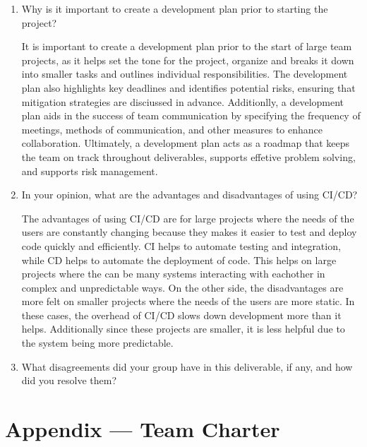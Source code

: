 \documentclass{article}
\begin{document}
\begin{enumerate}
    \item Why is it important to create a development plan prior to starting the
    project?

    It is important to create a development plan prior to the start of large team projects, as it helps set the tone for the project, organize and breaks it down into smaller tasks and outlines individual responsibilities. 
    The development plan also highlights key deadlines and identifies potential risks, ensuring that mitigation strategies are disciussed in advance.
    Additionlly, a development plan aids in the success of team communication by specifying the frequency of meetings, methods of communication, and other measures to enhance collaboration.
    Ultimately, a development plan acts as a roadmap that keeps the team on track throughout deliverables, supports effetive problem solving, and supports risk management.

    \item In your opinion, what are the advantages and disadvantages of using
    CI/CD?

    The advantages of using CI/CD are for large projects where the needs of the users are constantly changing because they makes it easier to test and deploy code quickly and efficiently.
    CI helps to automate testing and integration, while CD helps to automate the deployment of code.
    This helps on large projects where the can be many systems interacting with eachother in complex and unpredictable ways.
    On the other side, the disadvantages are more felt on smaller projects where the needs of the users are more static.
    In these cases, the overhead of CI/CD slows down development more than it helps.
    Additionally since these projects are smaller, it is less helpful due to the system being more predictable.


    \item What disagreements did your group have in this deliverable, if any,
    and how did you resolve them?

    
\end{enumerate}

\newpage{}

\section*{Appendix --- Team Charter}

\end{document}

